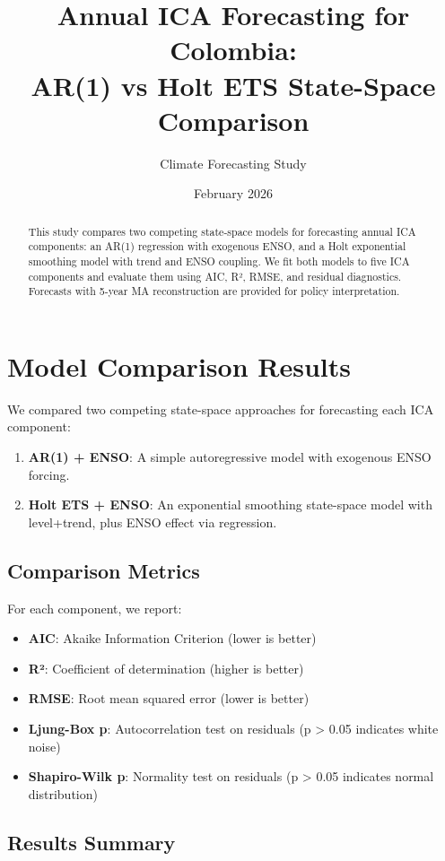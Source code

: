 \documentclass[12pt,a4paper]{article}
\title{Annual ICA Forecasting for Colombia: \\
AR(1) vs Holt ETS State-Space Comparison}
\author{Climate Forecasting Study}
\date{February 2026}
\begin{document}
\maketitle

\begin{abstract}
This study compares two competing state-space models for forecasting annual ICA components: 
an AR(1) regression with exogenous ENSO, and a Holt exponential smoothing model with trend and ENSO coupling. 
We fit both models to five ICA components and evaluate them using AIC, R², RMSE, and residual diagnostics.
Forecasts with 5-year MA reconstruction are provided for policy interpretation.
\end{abstract}

\section{Model Comparison Results}

We compared two competing state-space approaches for forecasting each ICA component:

\begin{enumerate}
\item \textbf{AR(1) + ENSO}: A simple autoregressive model with exogenous ENSO forcing.
\item \textbf{Holt ETS + ENSO}: An exponential smoothing state-space model with level+trend, plus ENSO effect via regression.
\end{enumerate}

\subsection{Comparison Metrics}

For each component, we report:
\begin{itemize}
\item \textbf{AIC}: Akaike Information Criterion (lower is better)
\item \textbf{R²}: Coefficient of determination (higher is better)
\item \textbf{RMSE}: Root mean squared error (lower is better)
\item \textbf{Ljung-Box p}: Autocorrelation test on residuals (p > 0.05 indicates white noise)
\item \textbf{Shapiro-Wilk p}: Normality test on residuals (p > 0.05 indicates normal distribution)
\end{itemize}

\subsection{Results Summary}
\end{document}
